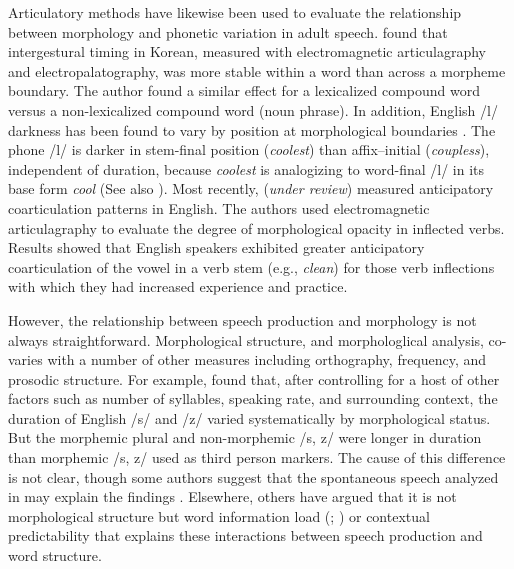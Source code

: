 \documentclass[a4paper,man,floatsintext,natbib,donotrepeattitle, apacite]{apa6}
\begin{document}
Articulatory methods have likewise been used to evaluate the relationship between morphology and phonetic variation in adult speech. \citet{choEffectsMorphemeBoundaries2001} found that intergestural timing in Korean, measured with electromagnetic articulagraphy and electropalatography, was more stable within a word than across a morpheme boundary. The author found a similar effect for a lexicalized compound word versus a non-lexicalized compound word (noun phrase). In addition, English /l/ darkness has been found to vary by position at morphological boundaries \citep{lee-kimMorphologicalEffectsDarkness2013}. The phone /l/ is darker in stem-final position (\textit{coolest}) than affix–initial (\textit{coupless}), independent of duration, because \textit{coolest} is analogizing to word-final /l/ in its base form \textit{cool} (See also \citealt{strycharczukGradualAbruptPhonetic2016}). Most recently, \citeauthor{tomaschekHowAnticipatoryCoarticulation2019} (\textit{under review}) measured anticipatory coarticulation patterns in English. The authors used electromagnetic articulagraphy to evaluate the degree of morphological opacity in inflected verbs. Results showed that English speakers exhibited greater anticipatory coarticulation of the vowel in a verb stem (e.g., \textit{clean}) for those verb inflections with which they had increased experience and practice. 

However, the relationship between speech production and morphology is not always straightforward. Morphological structure, and morphologlical analysis, co-varies with a number of other measures including orthography, frequency, and prosodic structure. For example, \citet{plagHomophonyMorphologyAcoustics2017} found that, after controlling for a host of other factors such as number of syllables, speaking rate, and surrounding context, the duration of English /s/ and /z/ varied systematically by morphological status. But the morphemic plural and non-morphemic /s, z/ were longer in duration than morphemic /s, z/ used as third person markers. The cause of this difference is not clear, though some authors suggest that the spontaneous speech analyzed in \citet{plagHomophonyMorphologyAcoustics2017} may explain the findings \citep{seyfarthAcousticDifferencesMorphologicallydistinct2018}. Elsewhere, others have argued that it is not morphological structure but word information load (\citealt{haniqueRoleMorphologyAcoustic2012}; \citealt{pluymaekersMorphologicalEffectsFine2010}) or contextual predictability \citep{cohenProbabilisticReductionProbabilistic2014} that explains these interactions between speech production and word structure. 
\end{document}
